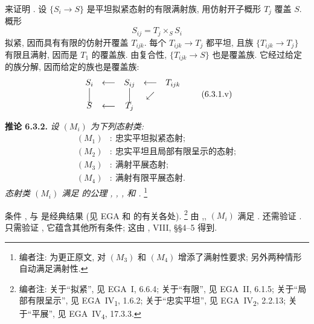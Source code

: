 来证明 .
设 \(\{S_i\to S\}\) 是平坦拟紧态射的有限满射族,
用仿射开子概形 \(T_j\) 覆盖 \(S\). 概形
\[
  S_{ij}=T_j\times_SS_i
\]
拟紧, 因而具有有限的仿射开覆盖 \(T_{ijk}\).
每个 \(T_{ijk}\to T_j\) 都平坦, 且族 \(\{T_{ijk}\to T_j\}\)
有限且满射, 因而是 \(T_1\) 的覆盖族.
由复合性, \(\{T_{ijk}\to S\}\) 也是覆盖族.
它经过给定的族分解, 因而给定的族也是覆盖族:
\[
\begin{array}{ccccc}
  S_i & \longleftarrow & S_{ij} & \longleftarrow & T_{ijk}\\
  \Big\downarrow & & \Big\downarrow & \swarrow &\\[-0.25em]
  S & \longleftarrow & T_j & &
\end{array}
\tag{6.3.1.v}\label{sga3:iv:proposition:6:3:1:eq:6:3:1:v:01}
\]

\medskip
\noindent{}\textbf{推论 6.3.2.}
\textit{设 \((M_i)\) 为下列态射类:}
\begin{align*}
 (M_1)&:\ \text{忠实平坦拟紧态射};\\
 (M_2)&:\ \text{忠实平坦且局部有限呈示的态射};\\
 (M_3)&:\ \text{满射平展态射};\\
 (M_4)&:\ \text{满射有限平展态射}.
\end{align*}
\textit{态射类 \((M_i)\) 满足  的公理
,
,
,
 和
.}
\footnote{编者注: 为更正原文, 对 \((M_3)\) 和 \((M_4)\) 增添了满射性要求;
另外两种情形自动满足满射性.}

条件 ,
 与
 是经典结果
(见 EGA 和  的有关各处).
\footnote{编者注: 关于“拟紧”, 见 EGA~I, 6.6.4;
关于“有限”, 见 EGA~II, 6.1.5;
关于“局部有限呈示”, 见 EGA~IV\textsubscript{1}, 1.6.2;
关于“忠实平坦”, 见 EGA~IV\textsubscript{2}, 2.2.13;
关于“平展”, 见 EGA~IV\textsubscript{4}, 17.3.3.}
由 ,,
\((M_i)\) 满足 .
还需验证 .
只需验证 ,
它蕴含其他所有条件; 这由 , VIII, \S\S4--5 得到.

